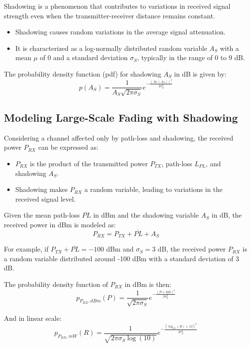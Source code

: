 Shadowing is a phenomenon that contributes to variations in received signal strength even when the transmitter-receiver distance remains constant.

\begin{itemize}
    \item Shadowing causes random variations in the average signal attenuation.
    \item It is characterized as a log-normally distributed random variable \( A_S \) with a mean \( \mu \) of 0 and a standard deviation \( \sigma_S \), typically in the range of 0 to 9 dB.
\end{itemize}

The probability density function (pdf) for shadowing \( A_S \) in dB is given by:
\[
p(A_S) = \frac{1}{A_S \sqrt{2\pi \sigma_S}} e^{-\frac{(\ln(A_S))^2}{2\sigma_S^2}}
\]

\subsection*{Modeling Large-Scale Fading with Shadowing}

Considering a channel affected only by path-loss and shadowing, the received power \( P_{RX} \) can be expressed as:

\begin{itemize}
    \item \( P_{RX} \) is the product of the transmitted power \( P_{TX} \), path-loss \( L_{PL} \), and shadowing \( A_S \).
    \item Shadowing makes \( P_{RX} \) a random variable, leading to variations in the received signal level.
\end{itemize}

Given the mean path-loss \( \overline{PL} \) in dBm and the shadowing variable \( A_S \) in dB, the received power in dBm is modeled as:
\[
P_{RX} = P_{TX} + \overline{PL} + A_S
\]

For example, if \( P_{TX} + \overline{PL} = -100 \) dBm and \( \sigma_S = 3 \) dB, the received power \( P_{RX} \) is a random variable distributed around -100 dBm with a standard deviation of 3 dB.

The probability density function of \( P_{RX} \) in dBm is then:
\[
p_{P_{RX},dBm}(P) = \frac{1}{\sqrt{2\pi\sigma_S}} e^{-\frac{(P + 100)^2}{2\sigma_S^2}}
\]

And in linear scale:
\[
p_{P_{RX},mW}(R) = \frac{1}{\sqrt{2\pi\sigma_S \log(10)}} e^{-\frac{(\log_{10}(R) + 13)^2}{2\sigma_S^2}}
\]


